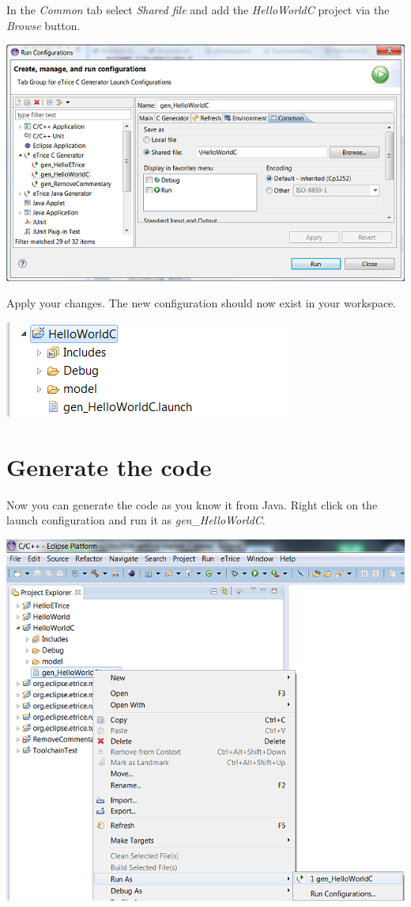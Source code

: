 In the \textit{Common} tab select \textit{Shared file} and add the \textit{HelloWorldC} project via the 
\textit{Browse} button.

\includegraphics{images/034-HelloWorldC10.png}

Apply your changes. The new configuration should now exist in your workspace.

\includegraphics{images/034-HelloWorldC11.png}


\section{Generate the code}

Now you can generate the code as you know it from Java. Right click on the launch configuration and run it 
as \textit{gen\_HelloWorldC}.

\includegraphics{images/034-HelloWorldC12.png}

